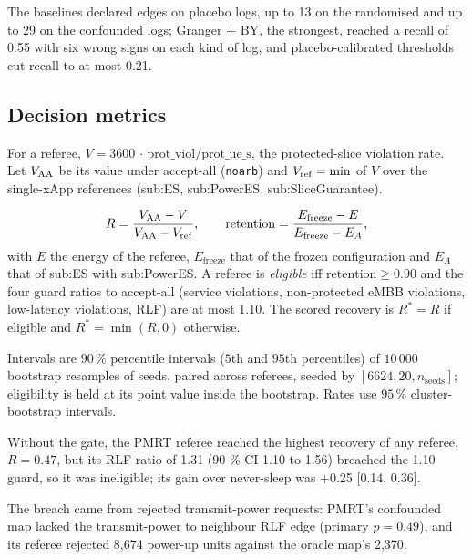 The baselines declared edges on placebo logs, up to 13 on the randomised and up to 29 on the confounded logs; Granger + BY, the strongest, reached a recall of 0.55 with six wrong signs on each kind of log, and placebo-calibrated thresholds cut recall to at most 0.21.

\subsection{Decision metrics}
\label{spec:met.decision}

For a referee, $V = 3600\,\cdot\,\mathrm{prot\_viol}/\mathrm{prot\_ue\_s}$, the protected-slice violation rate. Let $V_{\mathrm{AA}}$ be its value under accept-all (\texttt{noarb}) and $V_{\mathrm{ref}} = \min$ of $V$ over the single-xApp references (sub:ES, sub:PowerES, sub:SliceGuarantee).

\begin{definition}
\begin{equation*}
R = \frac{V_{\mathrm{AA}} - V}{V_{\mathrm{AA}} - V_{\mathrm{ref}}}, \qquad
\text{retention} = \frac{E_{\mathrm{freeze}} - E}{E_{\mathrm{freeze}} - E_{A}},
\end{equation*}
with $E$ the energy of the referee, $E_{\mathrm{freeze}}$ that of the frozen configuration and $E_A$ that of sub:ES with sub:PowerES. A referee is \emph{eligible} iff $\text{retention} \ge 0.90$ and the four guard ratios to accept-all (service violations, non-protected eMBB violations, low-latency violations, RLF) are at most $1.10$. The scored recovery is $R^* = R$ if eligible and $R^* = \min(R, 0)$ otherwise.
\end{definition}

\noindent Intervals are $90\,\%$ percentile intervals ($5$th and $95$th percentiles) of $10\,000$ bootstrap resamples of seeds, paired across referees, seeded by $[6624, 20, n_{\mathrm{seeds}}]$; eligibility is held at its point value inside the bootstrap. Rates use $95\,\%$ cluster-bootstrap intervals.


Without the gate, the PMRT referee reached the highest recovery of any referee, $R = 0.47$, but its RLF ratio of 1.31 (90 \% CI 1.10 to 1.56) breached the 1.10 guard, so it was ineligible; its gain over never-sleep was +0.25 [0.14, 0.36].

The breach came from rejected transmit-power requests: PMRT's confounded map lacked the transmit-power to neighbour RLF edge (primary $p = 0.49$), and its referee rejected 8,674 power-up units against the oracle map's 2,370.

